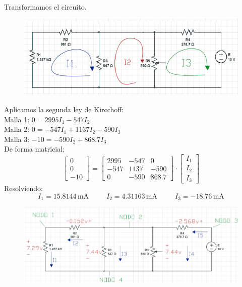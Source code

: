 \documentclass[a4paper,12pt]{report}
\begin{document}
\begin{enumerate}
\begin{figure}[H]
\begin{center}
\end{center}
\end{figure}
Transformamos el circuito.
\begin{figure}[H]
\begin{center}
\includegraphics[scale=0.55]{sergodcirc2,2.png}
\end{center}
\end{figure}
Aplicamos la segunda ley de Kircchoff:\\
Malla 1: $0 = 2995I_{1} - 547I_{2}$\\
Malla 2: $0 = -547I_{1} + 1137I_{2} - 590I_{3}$\\
Malla 3: $-10 = -590I_{2} + 868.7I_{3}$\\
De forma matricial:
$$
\begin{bmatrix}
0\\
0\\
-10
\end{bmatrix}
 = 
\begin{bmatrix}
2995 & -547 & 0\\
-547 & 1137 & -590\\
0 & -590 & 868.7
\end{bmatrix} \cdot \begin{bmatrix}
I_{1}\\
I_{2}\\
I_{3}
\end{bmatrix}
$$
Resolviendo:
$$
I_{1} = 15.8144\,\mathrm{mA} \hspace{30pt} I_{2} = 4.31163\,\mathrm{mA} \hspace{30pt} I_{3} = -18.76\,\mathrm{mA}
$$
\begin{figure}[H]
\begin{center}
\includegraphics[scale=0.45]{sergodcirc2,3.png}

\end{center}
\end{figure}
\end{enumerate}
\end{document}
